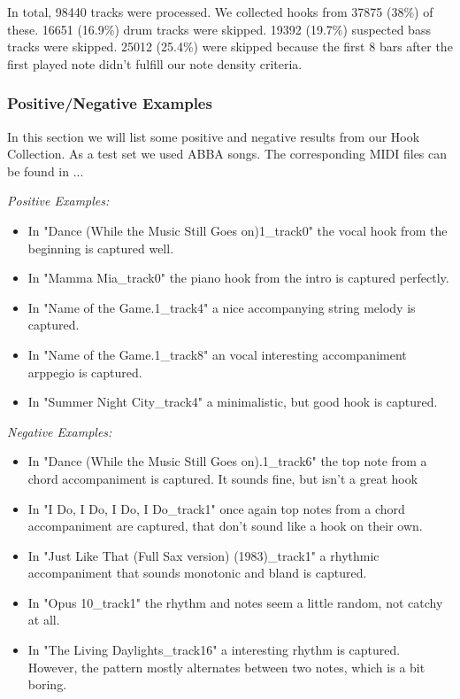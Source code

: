 \documentclass[a4paper,12pt]{extarticle}
\begin{document}
In total, 98440 tracks were processed. We collected hooks from 37875 (38\%) of these. 16651 (16.9\%) drum tracks were skipped. 19392 (19.7\%) suspected bass tracks were skipped. 25012 (25.4\%) were skipped because the first 8 bars after the first played note didn't fulfill our note density criteria.

\subsubsection{Positive/Negative Examples}
In this section we will list some positive and negative results from our Hook Collection. As a test set we used ABBA songs. The corresponding MIDI files can be found in ... \newline

\textit{Positive Examples:}

\begin{itemize}
    \item In "Dance (While the Music Still Goes on)1\_track0" the vocal hook from the beginning is captured well.
    \item In "Mamma Mia\_track0" the piano hook from the intro is captured perfectly.
    \item In "Name of the Game.1\_track4" a nice accompanying string melody is captured.
    \item In "Name of the Game.1\_track8" an vocal interesting accompaniment arppegio is captured.
    \item In "Summer Night City\_track4" a minimalistic, but good hook is captured.
\end{itemize}

\textit{Negative Examples:}

\begin{itemize}
    \item In "Dance (While the Music Still Goes on).1\_track6" the top note from a chord accompaniment is captured. It sounds fine, but isn't a great hook
    \item In "I Do, I Do, I Do, I Do\_track1" once again top notes from a chord accompaniment are captured, that don't sound like a hook on their own.
    \item In "Just Like That (Full Sax version) (1983)\_track1" a rhythmic accompaniment that sounds monotonic and bland is captured.
    \item In "Opus 10\_track1" the rhythm and notes seem a little random, not catchy at all.
    \item In "The Living Daylights\_track16" a interesting rhythm is captured. However, the pattern mostly alternates between two notes, which is a bit boring.
\end{itemize}
\end{document}
